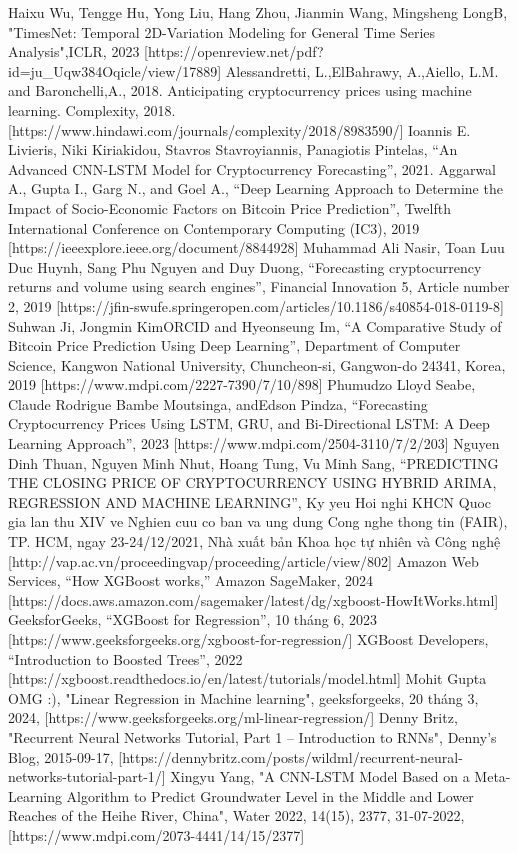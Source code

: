 \documentclass[conference]{IEEEtran}
\begin{document}
\begin{thebibliography}{9}

 Haixu Wu, Tengge Hu, Yong Liu, Hang Zhou, Jianmin Wang, Mingsheng LongB, "TimesNet: Temporal 2D-Variation Modeling for General Time Series Analysis",ICLR, 2023 [https://openreview.net/pdf?id=ju\_Uqw384Oqicle/view/17889]
 Alessandretti, L.,ElBahrawy, A.,Aiello, L.M. and Baronchelli,A., 2018. Anticipating cryptocurrency prices using machine learning. Complexity, 2018. [https://www.hindawi.com/journals/complexity/2018/8983590/]
 Ioannis E. Livieris, Niki Kiriakidou, Stavros Stavroyiannis, Panagiotis Pintelas, “An Advanced CNN-LSTM Model for 
Cryptocurrency Forecasting”, 2021.
 Aggarwal A., Gupta I., Garg N., and Goel A., “Deep Learning Approach to Determine the Impact of Socio-Economic Factors on Bitcoin Price Prediction”, Twelfth International Conference on Contemporary Computing (IC3), 2019 [https://ieeexplore.ieee.org/document/8844928]
 Muhammad Ali Nasir, Toan Luu Duc Huynh, Sang Phu Nguyen and Duy Duong, “Forecasting cryptocurrency returns and volume using search engines”, Financial Innovation 5, Article number 2, 2019 [https://jfin-swufe.springeropen.com/articles/10.1186/s40854-018-0119-8]
 Suhwan Ji, Jongmin KimORCID and Hyeonseung Im, “A Comparative Study of Bitcoin Price Prediction Using Deep Learning”, Department of Computer Science, Kangwon National University, Chuncheon-si, Gangwon-do 24341, Korea, 2019 [https://www.mdpi.com/2227-7390/7/10/898]
 Phumudzo Lloyd Seabe, Claude Rodrigue Bambe Moutsinga, andEdson Pindza, “Forecasting Cryptocurrency Prices Using LSTM, GRU, and Bi-Directional LSTM: A Deep Learning Approach”, 2023 [https://www.mdpi.com/2504-3110/7/2/203]
 Nguyen Dinh Thuan, Nguyen Minh Nhut, Hoang Tung, Vu Minh Sang, “PREDICTING THE CLOSING PRICE OF CRYPTOCURRENCY USING HYBRID ARIMA, REGRESSION AND MACHINE LEARNING”, Ky yeu Hoi nghi KHCN Quoc gia lan thu XIV ve Nghien cuu co ban va ung dung Cong nghe thong tin (FAIR), TP. HCM, ngay 23-24/12/2021, Nhà xuất bản Khoa học tự nhiên và Công nghệ [http://vap.ac.vn/proceedingvap/proceeding/article/view/802]
 Amazon Web Services, “How XGBoost works,” Amazon SageMaker, 2024 [https://docs.aws.amazon.com/sagemaker/latest/dg/xgboost-HowItWorks.html]
 GeeksforGeeks, “XGBoost for Regression”, 10 tháng 6, 2023 [https://www.geeksforgeeks.org/xgboost-for-regression/]
 XGBoost Developers, “Introduction to Boosted Trees”, 2022 [https://xgboost.readthedocs.io/en/latest/tutorials/model.html]
 Mohit Gupta OMG :), "Linear Regression in Machine learning", geeksforgeeks, 20 tháng 3, 2024, [https://www.geeksforgeeks.org/ml-linear-regression/]
 Denny Britz, "Recurrent Neural Networks Tutorial, Part 1 – Introduction to RNNs", Denny's Blog, 2015-09-17, [https://dennybritz.com/posts/wildml/recurrent-neural-networks-tutorial-part-1/]
 Xingyu Yang, "A CNN-LSTM Model Based on a Meta-Learning Algorithm to Predict Groundwater Level in the Middle and Lower Reaches of the Heihe River, China", Water 2022, 14(15), 2377, 31-07-2022, [https://www.mdpi.com/2073-4441/14/15/2377]
\end{thebibliography}
\end{document}
